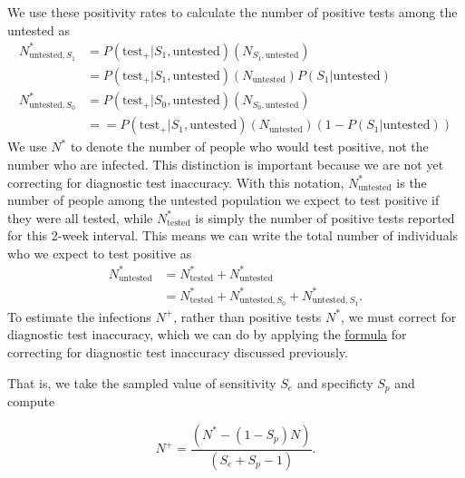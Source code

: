 \documentclass[12pt,twoside]{smiththesis}
\begin{document}
We use these positivity rates to calculate the number of positive tests among the untested as
\begin{align*}
N^*_{\text{untested},S_1} &= P( \text{test}_+ | S_1, \text{untested}) ( N_{S_1,\text{untested}}) \\
&= P( \text{test}_+ | S_1, \text{untested}) (N_{\text{untested}} ) P(S_1|\text{untested})\\
N^*_{\text{untested},S_0} &= P( \text{test}_+ | S_0, \text{untested}) ( N_{S_0,\text{untested}})\\
&== P( \text{test}_+ | S_1, \text{untested}) (N_{\text{untested}} ) (1- P(S_1|\text{untested}))
\end{align*}
We use \(N^*\) to denote the number of people who would test positive, not the number who are infected. This distinction is important because we are not yet correcting for diagnostic test inaccuracy. With this notation, \(N^*_{\text{untested}}\) is the number of people among the untested population we expect to test positive if they were all tested, while \(N^*_{\text{tested}}\) is simply the number of positive tests reported for this 2-week interval. This means we can write the total number of individuals who we expect to test positive as
\begin{align*}
 N^*_{\text{untested}}
 &= N^*_{\text{tested}} + N^*_{\text{untested}} \\
 &= N^*_{\text{tested}} + N^*_{\text{untested}, S_0} + N^*_{\text{untested}, S_1}.
\end{align*}
To estimate the infections \(N^+\), rather than positive tests \(N^*\), we must correct for diagnostic test inaccuracy, which we can do by applying the \protect\hyperlink{correct-test-inaccuracy}{formula} for correcting for diagnostic test inaccuracy discussed previously.

That is, we take the sampled value of sensitivity \(S_e\) and specificty \(S_p\) and compute

\[N^+ = \dfrac{(N^* - (1 - S_p) N) } { (S_e + S_p - 1) }.\]
\end{document}
